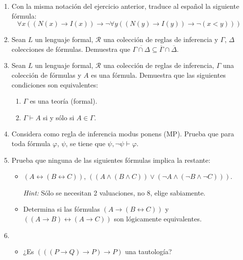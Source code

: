 \documentclass[11pt,answers]{exam}
\begin{document}
\begin{enumerate}
    
    
    \item Con la misma notación del ejercicio anterior, traduce al español la siguiente fórmula:
    \[
    \forall x ((N(x) \to I(x)) \to \neg \forall y ((N(y) \to I(y)) \to \neg (x < y)))
    \]
    

    \item Sean $L$ un lenguaje formal, $\mathscr{R}$ una colección de reglas de inferencia y $\Gamma$, $\Delta$ colecciones de fórmulas. Demuestra que $\overline{\Gamma \cap \Delta} \subseteq \overline{\Gamma} \cap \overline{\Delta}$.
    

    \item Sean $L$ un lenguaje formal, $\mathscr{R}$ una colección de reglas de inferencia, $\Gamma$ una colección de fórmulas y $A$ es una fórmula. Demuestra que las siguientes condiciones son equivalentes:
    \begin{enumerate}
        \item $\Gamma$ es una teoría (formal).
        \item $\Gamma \vdash A$ si y sólo si $A \in \Gamma$.
    \end{enumerate}
    
    
    \item Considera como regla de inferencia modus ponens (MP). Prueba que para toda fórmula $\varphi$, $\psi$, se tiene que $\psi, \neg \psi \vdash \varphi$.
    
    
    \item Prueba que ninguna de las siguientes fórmulas implica la restante: 
    \begin{itemize}
        \item $(A \leftrightarrow (B \leftrightarrow C))$, $((A \land (B \land C)) \lor (\neg A \land (\neg B \land \neg C)))$. 
        
        \textit{Hint:} Sólo se necesitan 2 valuaciones, no 8, elige sabiamente.

        \item Determina si las fórmulas $(A \to (B \leftrightarrow C))$ y $((A \to B) \leftrightarrow (A \to C))$ son lógicamente equivalentes.
    \end{itemize}

    

    \item \begin{itemize}
        \item ¿Es $(((P \to Q) \to P) \to P)$ una tautología?


\end{itemize}
\end{enumerate}
\end{document}
